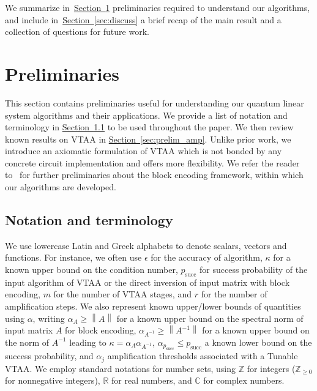 \documentclass[letterpaper,onecolumn,11pt,accepted=2026-02-14]{quantumarticle}
\newcommand{\norm}[1]{\left\lVert#1\right\rVert}
\theoremstyle{remark}
\theoremstyle{plain}
\renewcommand{\sec}[1]{\hyperref[sec:#1]{Section~\ref*{sec:#1}}}
\begin{document}
We summarize in~\sec{prelim} preliminaries required to understand our algorithms, and include in~\sec{discuss} a brief recap of the main result and a collection of questions for future work.

\section{Preliminaries}
\label{sec:prelim}

This section contains preliminaries useful for understanding our quantum linear system algorithms and their applications. We provide a list of notation and terminology in \sec{prelim_notation} to be used throughout the paper. We then review known results on VTAA in \sec{prelim_amp}. Unlike prior work, we introduce an axiomatic formulation of VTAA which is not bonded by any concrete circuit implementation and offers more flexibility. We refer the reader to~\cite[Section 2.4]{QEVP} for further preliminaries about the block encoding framework, within which our algorithms are developed.

\subsection{Notation and terminology}
\label{sec:prelim_notation}
We use lowercase Latin and Greek alphabets to denote scalars, vectors and functions. For instance, we often use $\epsilon$ for the accuracy of algorithm, $\kappa$ for a known upper bound on the condition number, $p_{\text{succ}}$ for success probability of the input algorithm of VTAA or the direct inversion of input matrix with block encoding, $m$ for the number of VTAA stages, and $r$ for the number of amplification steps. We also represent known upper/lower bounds of quantities using $\alpha$, writing $\alpha_A\geq\norm{A}$ for a known upper bound on the spectral norm of input matrix $A$ for block encoding, $\alpha_{A^{-1}}\geq\norm{A^{-1}}$ for a known upper bound on the norm of $A^{-1}$ leading to $\kappa=\alpha_A\alpha_{A^{-1}}$, $\alpha_{p_{\text{succ}}}\leq p_{\text{succ}}$ a known lower bound on the success probability, and $\alpha_j$ amplification thresholds associated with a Tunable VTAA. We employ standard notations for number sets, using $\mathbb{Z}$ for integers ($\mathbb{Z}_{\geq 0}$ for nonnegative integers), $\mathbb{R}$ for real numbers, and $\mathbb{C}$ for complex numbers.
\end{document}
